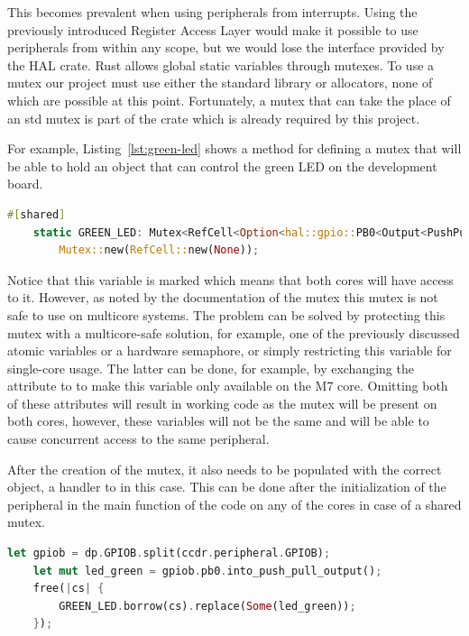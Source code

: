 This becomes prevalent when using peripherals from interrupts. Using the previously introduced Register Access Layer would make it possible to use peripherals from within any scope, but we would lose the interface provided by the HAL crate. Rust allows global static variables through mutexes. To use a mutex our project must use either the standard library or allocators, none of which are possible at this point. Fortunately, a mutex that can take the place of an std mutex is part of the  crate which is already required by this project.

For example, Listing~\ref{lst:green-led} shows a method for defining a mutex that will be able to hold an object that can control the green LED on the development board.

\begin{lstlisting}[language=Rust,frame=single,float=!ht,style=customrust,label={lst:green-led},caption={Static Mutex for a GPIO Output}]
    #[shared]
    static GREEN_LED: Mutex<RefCell<Option<hal::gpio::PB0<Output<PushPull>>>>> =
        Mutex::new(RefCell::new(None));
\end{lstlisting}

Notice that this variable is marked \mycode{#[shared]} which means that both cores will have access to it. However, as noted by the documentation of the mutex \cite{CortexMMutexDoc} this mutex is not safe to use on multicore systems. The problem can be solved by protecting this mutex with a multicore-safe solution, for example, one of the previously discussed atomic variables or a hardware semaphore, or simply restricting this variable for single-core usage. The latter can be done, for example, by exchanging the \mycode{#[shared]} attribute to \mycode{#[config(core = "0")]} to make this variable only available on the M7 core. Omitting both of these attributes will result in working code as the mutex will be present on both cores, however, these variables will not be the same and will be able to cause concurrent access to the same peripheral.

After the creation of the mutex, it also needs to be populated with the correct object, a handler to  in this case. This can be done after the initialization of the peripheral in the main function of the code on any of the cores in case of a shared mutex.

\begin{lstlisting}[language=Rust,frame=single,float=!ht,style=customrust,label={lst:populate-mutex},caption={Adding the Handler of the LED to the Mutex}]
    let gpiob = dp.GPIOB.split(ccdr.peripheral.GPIOB);
    let mut led_green = gpiob.pb0.into_push_pull_output();
    free(|cs| {
        GREEN_LED.borrow(cs).replace(Some(led_green));
    });
\end{lstlisting}

